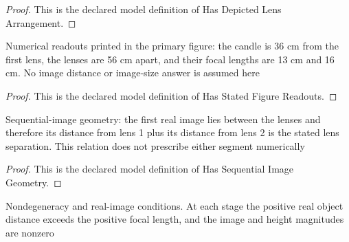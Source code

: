 \begin{proof}
  This is the declared model definition of Has Depicted Lens Arrangement.
\end{proof}
\begin{definition}
  \label{def:physics:phyx-mini-0144:phyxminiproblems-problemphyxmini0144-hasstatedfigurereadouts}
  Numerical readouts printed in the primary figure: the candle is 36 cm from the first lens, the lenses are 56 cm apart, and their focal lengths are 13 cm and 16 cm. No image distance or image-size answer is assumed here
\end{definition}
\begin{proof}
  This is the declared model definition of Has Stated Figure Readouts.
\end{proof}
\begin{definition}
  \label{def:physics:phyx-mini-0144:phyxminiproblems-problemphyxmini0144-hassequentialimagegeometry}
  Sequential-image geometry: the first real image lies between the lenses and therefore its distance from lens 1 plus its distance from lens 2 is the stated lens separation. This relation does not prescribe either segment numerically
\end{definition}
\begin{proof}
  This is the declared model definition of Has Sequential Image Geometry.
\end{proof}
\begin{definition}
  \label{def:physics:phyx-mini-0144:phyxminiproblems-problemphyxmini0144-hasphysicalrealimageconfiguration}
  Nondegeneracy and real-image conditions. At each stage the positive real object distance exceeds the positive focal length, and the image and height magnitudes are nonzero
\end{definition}
